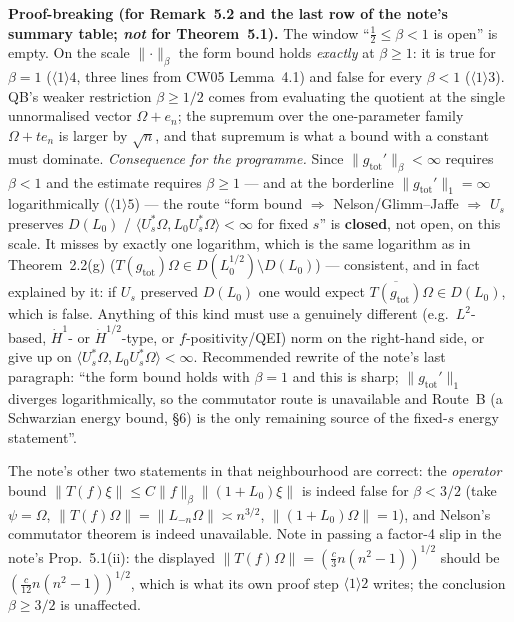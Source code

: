 \documentclass[11pt]{article}
\newcommand{\Om}{\Omega}
\newcommand{\ipp}[2]{\langle #1,#2\rangle}
\newcommand{\nrm}[1]{\lVert #1\rVert}
\newcommand{\gtot}{g_{\mathrm{tot}}}
\begin{document}
\begin{verdictbreak}
\textbf{Proof-breaking (for Remark~5.2 and the last row of the note's summary table; \emph{not} for
Theorem~5.1).}  The window ``$\tfrac12\le\beta<1$ is open'' is empty.  On the scale $\nrm\cdot_\beta$ the form
bound holds \emph{exactly} at $\beta\ge1$: it is true for $\beta=1$ ($\langle1\rangle4$, three lines from CW05
Lemma~4.1) and false for every $\beta<1$ ($\langle1\rangle3$).  QB's weaker restriction $\beta\ge1/2$ comes from
evaluating the quotient at the single unnormalised vector $\Om+e_n$; the supremum over the one-parameter family
$\Om+te_n$ is larger by $\sqrt n$, and that supremum is what a bound with a constant must dominate.
\emph{Consequence for the programme.}  Since $\nrm{\gtot'}_\beta<\infty$ requires $\beta<1$ and the estimate
requires $\beta\ge1$ --- and at the borderline $\nrm{\gtot'}_1=\infty$ logarithmically ($\langle1\rangle5$) ---
the route ``form bound $\Rightarrow$ Nelson/Glimm--Jaffe $\Rightarrow$ $U_s$ preserves $D(L_0)$ /
$\ipp{U_s^*\Om}{L_0U_s^*\Om}<\infty$ for fixed $s$'' is \textbf{closed}, not open, on this scale.  It misses by
exactly one logarithm, which is the same logarithm as in Theorem~2.2(g) ($T(\gtot)\Om\in D(L_0^{1/2})\setminus
D(L_0)$) --- consistent, and in fact explained by it: if $U_s$ preserved $D(L_0)$ one would expect
$\overline{T(\gtot)}\Om\in D(L_0)$, which is false.  Anything of this kind must use a genuinely different
(e.g.\ $L^2$-based, $\dot H^{1}$- or $\dot H^{1/2}$-type, or $f$-positivity/QEI) norm on the right-hand side, or
give up on $\ipp{U_s^*\Om}{L_0U_s^*\Om}<\infty$.  Recommended rewrite of the note's last paragraph: ``the form
bound holds with $\beta=1$ and this is sharp; $\nrm{\gtot'}_1$ diverges logarithmically, so the commutator route
is unavailable and Route~B (a Schwarzian energy bound, \S6) is the only remaining source of the fixed-$s$ energy
statement''.
\end{verdictbreak}

The note's other two statements in that neighbourhood are correct: the \emph{operator} bound
$\nrm{T(f)\xi}\le C\nrm f_\beta\nrm{(1+L_0)\xi}$ is indeed false for $\beta<3/2$ (take $\psi=\Om$,
$\nrm{T(f)\Om}=\nrm{L_{-n}\Om}\asymp n^{3/2}$, $\nrm{(1+L_0)\Om}=1$), and Nelson's commutator theorem is indeed
unavailable.  Note in passing a factor-4 slip in the note's Prop.~5.1(ii): the displayed
$\nrm{T(f)\Om}=(\frac c3n(n^2-1))^{1/2}$ should be $(\frac c{12}n(n^2-1))^{1/2}$, which is what its own proof
step $\langle1\rangle2$ writes; the conclusion $\beta\ge3/2$ is unaffected.
\end{document}
